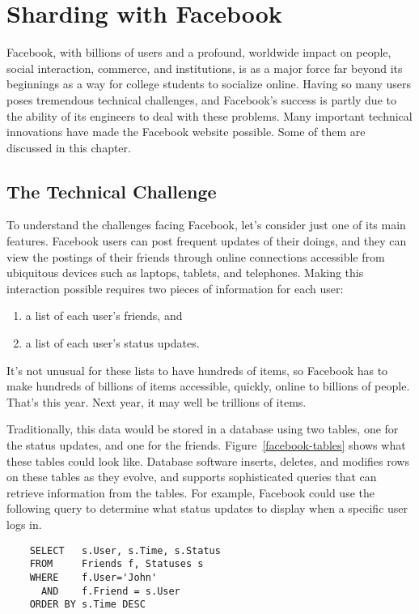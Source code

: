 \chapter{Sharding with Facebook}

Facebook,
with billions of users and a profound, worldwide impact
on people, social interaction, commerce, and institutions,
is as a major force far beyond its beginnings
as a way for college students to socialize online.
Having so many users poses tremendous technical challenges,
and Facebook's success is partly due to
the ability of its engineers to deal with these problems.
Many important technical innovations
have made the Facebook website possible.
Some of them are discussed in this chapter.

\section{The Technical Challenge}

To understand the challenges facing Facebook,
let's consider just one of its main features.
Facebook users can post frequent updates of their doings,
and they can view the postings of their friends through online connections
accessible from ubiquitous devices such as laptops, tablets, and telephones.
Making this interaction possible requires two pieces of information for each user:
\begin{enumerate}
	\item a list of each user's friends, and
	\item a list of each user's status updates.
\end{enumerate}

It's not unusual for these lists to have hundreds of items,
so Facebook has to make hundreds of billions of items
accessible, quickly, online to billions of people.
That's this year. Next year, it may well be trillions of items.

Traditionally, this data would be stored in a database
using two tables, one for the status updates,
and one for the friends.  Figure~\ref{facebook-tables}
shows what these tables could look like.
Database software inserts, deletes, and modifies
rows on these tables as they evolve,
and supports sophisticated queries that can
retrieve information from the tables.
For example, Facebook could use the following query to determine
what status updates to display when a specific user logs in.
\begin{code}
\begin{verbatim}
	SELECT   s.User, s.Time, s.Status
	FROM     Friends f, Statuses s
	WHERE    f.User='John'
	  AND    f.Friend = s.User
	ORDER BY s.Time DESC
\end{verbatim}
\end{code}

